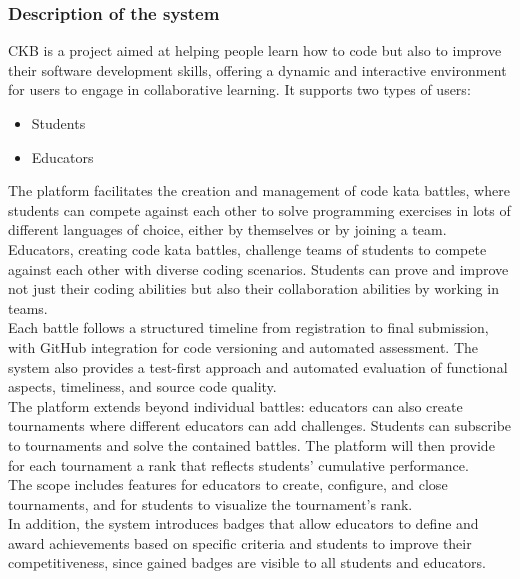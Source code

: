 \subsubsection{Description of the system}
CKB is a project aimed at helping people learn how to code but also to improve their software development skills, offering a dynamic and interactive environment for users to engage in collaborative learning. It supports two types of users:
\begin{itemize}
  \item Students
  \item Educators
\end{itemize}
The platform facilitates the creation and management of code kata battles, where students can compete against each other to solve programming exercises in lots of different languages of choice, 
either by themselves or by joining a team.  \\
Educators, creating code kata battles, challenge teams of students to compete against each other with diverse coding scenarios. Students can prove and improve not just their coding abilities but also their collaboration abilities by working in teams. \\
Each battle follows a structured timeline from registration to final submission, with GitHub integration for code versioning and automated assessment.
The system also provides a test-first approach and automated evaluation of functional aspects, timeliness, and source code quality. \\
The platform extends beyond individual battles: educators can also create tournaments where different educators can add challenges. Students can subscribe to tournaments and solve the contained battles. The platform will then provide for each tournament a rank that reflects students' cumulative performance. \\
The scope includes features for educators to create, configure, and close tournaments, and for students to visualize the tournament's rank. \\
In addition, the system introduces badges that allow educators to define and award achievements based on specific criteria and students to improve their competitiveness, since gained badges are visible to all students and educators. \\

\newpage

